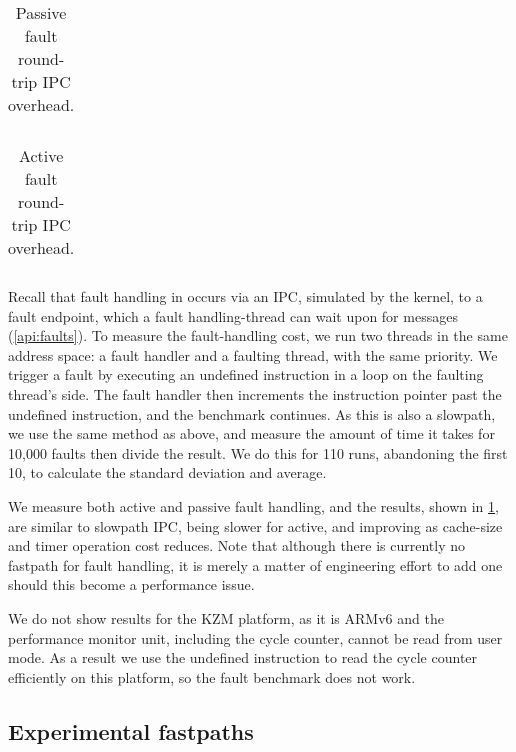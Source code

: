 \begin{table}[t]\centering
    \begin{tabularx}{\textwidth}{Xllllll}\toprule

    \bottomrule
\end{tabularx}
\caption{Passive fault round-trip IPC overhead.}
\label{t:slowpath-fault-micro}
\end{table}

\begin{table}[b]\centering
    \begin{tabularx}{\textwidth}{Xllllll}\toprule

    \bottomrule
\end{tabularx}
\caption{Active fault round-trip IPC overhead.}
\label{t:slowpath-fault-micro-passive}
\end{table}

Recall that fault handling in \selfour occurs via an \gls{IPC}, simulated by the kernel, to a fault
endpoint, which a fault handling-thread can wait upon for messages (\cref{api:faults}). 
To measure the fault-handling cost, we run two threads in the same address space: a fault handler
and a faulting thread, with the same priority. We trigger a fault by executing an undefined instruction in a loop on the faulting thread's
side. The fault handler then increments the instruction pointer past the undefined
instruction, and the benchmark continues.  As this is also a slowpath, we use the same method as
above, and measure the amount of time it takes for 10,000 faults then divide the result. We do this
for 110 runs, abandoning the first 10, to calculate the standard deviation and average. 

We measure both active and passive fault handling, and the results, shown in
\cref{t:slowpath-fault-micro}, are similar to slowpath
\gls{IPC}, being slower for active, and improving as cache-size and timer operation cost reduces. 
Note that although there is currently no fastpath for fault handling, it is merely a matter of
engineering effort to add one should this become a performance issue. 

We do not show results for the \textsc{KZM} platform, as it is ARMv6 and the performance monitor
unit, including the cycle counter, cannot be read from user mode. As a result we use the
undefined instruction to read the cycle counter efficiently on this platform, 
so the fault benchmark does not work.
\clearpage
\subsection{Experimental fastpaths}

